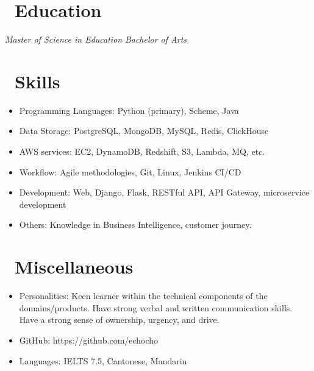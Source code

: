 \documentclass{resume}
\begin{document}
\section{\faGraduationCap\ Education}
\textit{Master of Science in Education}
\textit{Bachelor of Arts}

\section{\faCogs\ Skills}
\begin{itemize}[parsep=0.5ex]
  \item Programming Languages: Python (primary), Scheme, Java
  \item Data Storage: PostgreSQL, MongoDB, MySQL, Redis, ClickHouse
  \item AWS services: EC2, DynamoDB, Redshift, S3, Lambda, MQ, etc.
  \item Workflow: Agile methodologies, Git, Linux, Jenkins CI/CD
  \item Development: Web, Django, Flask, RESTful API, API Gateway, microservice development
  \item Others: Knowledge in Business Intelligence, customer journey.
\end{itemize}

\section{\faInfo\ Miscellaneous}
\begin{itemize}[parsep=0.5ex]
  \item Personalities: Keen learner within the technical components of the domains/products. Have strong verbal and written communication skills. Have a strong sense of ownership, urgency, and drive.
  \item GitHub: https://github.com/echocho
  \item Languages: IELTS 7.5, Cantonese, Mandarin
\end{itemize}

%
%
\end{document}

